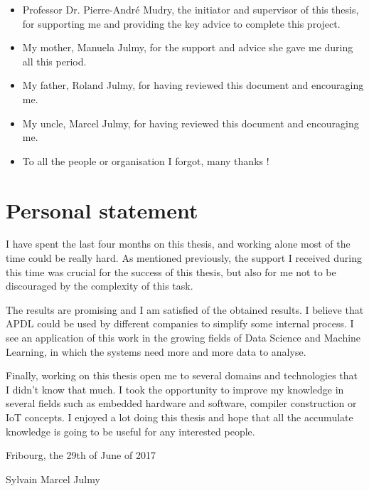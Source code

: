 \begin{itemize}
\item Professor Dr. Pierre-André Mudry, the initiator and supervisor of this
  thesis, for supporting me and providing the key advice to complete this
  project.
\item My mother, Manuela Julmy, for the support and advice she gave me
  during all this period.
\item My father, Roland Julmy, for having reviewed this document and encouraging
  me.
\item My uncle, Marcel Julmy, for having reviewed this document and encouraging
  me.
\item To all the people or organisation I forgot, many thanks !
\end{itemize}

\section{Personal statement}
\label{sec:personal_statement}

I have spent the last four months on this thesis, and working alone most of the
time could be really hard. As mentioned previously, the support I received during
this time was crucial for the success of this thesis, but also for me not to
be discouraged by the complexity of this task.

The results are promising and I am satisfied of the obtained results. I
believe that APDL could be used by different companies to simplify some internal
process. I see an application of this work in the growing fields of Data Science
and Machine Learning, in which the systems need more and more data to analyse.

Finally, working on this thesis open me to several domains and technologies that
I didn't know that much. I took the opportunity to improve my knowledge in
several fields such as embedded hardware and software, compiler construction or
IoT concepts. I enjoyed a lot doing this thesis and hope that all the accumulate
knowledge is going to be useful for any interested people.

Fribourg, the 29th of June of 2017

Sylvain Marcel Julmy

